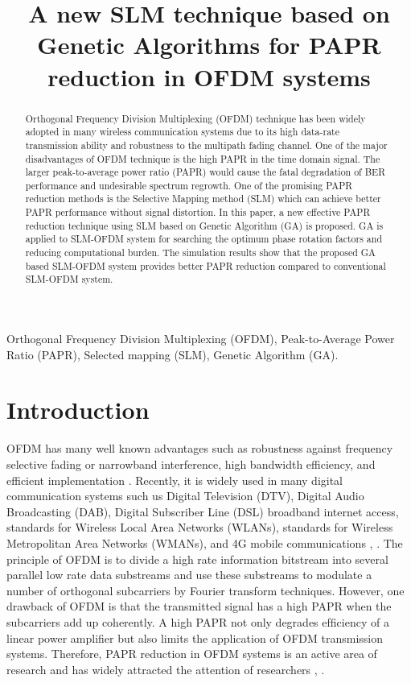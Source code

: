 \documentclass[conference]{IEEEtran}
\begin{document}
\title{A new SLM technique based on Genetic Algorithms for PAPR reduction in OFDM systems}

\author{
}

\maketitle

\begin{abstract}
Orthogonal Frequency Division Multiplexing (OFDM) technique has been widely adopted in many wireless communication systems due to its high data-rate transmission ability and robustness to the multipath fading channel. One of the major disadvantages of OFDM technique is the high PAPR in the time domain signal. The larger peak-to-average power ratio (PAPR) would cause the fatal degradation of BER performance and undesirable spectrum regrowth. One of the promising PAPR reduction methods is the Selective Mapping method (SLM) which can achieve better PAPR performance without signal distortion. In this paper, a new effective PAPR reduction technique using SLM based on Genetic Algorithm (GA) is proposed. GA is applied to SLM-OFDM system for searching the optimum phase rotation factors and reducing computational burden. The simulation results show that the proposed GA based SLM-OFDM system provides better PAPR reduction compared to conventional SLM-OFDM system.
\end{abstract}

\begin{IEEEkeywords}
Orthogonal Frequency Division Multiplexing (OFDM), Peak-to-Average Power Ratio (PAPR), Selected mapping (SLM), Genetic Algorithm (GA).
\end{IEEEkeywords}

\section{Introduction}
OFDM has many well known advantages such as robustness against frequency selective fading or narrowband interference, high bandwidth efficiency, and efficient implementation \cite{b1}. Recently, it is widely used in many digital communication systems such us Digital Television (DTV), Digital Audio Broadcasting (DAB), Digital Subscriber Line (DSL) broadband internet access, standards for Wireless Local Area Networks (WLANs), standards for Wireless Metropolitan Area Networks (WMANs), and 4G mobile communications \cite{b2}, \cite{b3}. The principle of OFDM is to divide a high rate information bitstream into several parallel low rate data substreams and use these substreams to modulate a number of orthogonal subcarriers by Fourier transform techniques. However, one drawback of OFDM is that the transmitted signal has a high PAPR when the subcarriers add up coherently. A high PAPR not only degrades efﬁciency of a linear power ampliﬁer but also limits the application of OFDM transmission systems. Therefore, PAPR reduction in OFDM systems is an active area of research and has widely attracted the attention of researchers \cite{b2}, \cite{b4}.
\end{document}
